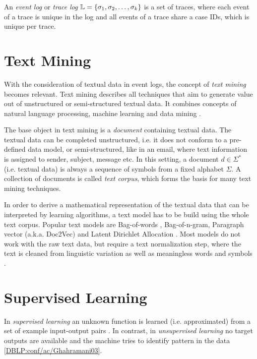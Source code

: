 \begin{definition}
	An \textit{event log} or \textit{trace log} $\mathbb{L} = \{ \sigma_1, \sigma _2, \dots, \sigma_k \}$ is a set of traces, where each event of a trace is unique in the log and all events of a trace share a case IDs, which is unique per trace.
\end{definition}

\section{Text Mining}

With the consideration of textual data in event logs, the concept of \textit{text mining} becomes relevant.
Text mining describes all techniques that aim to generate value out of unstructured or semi-structured textual data.
It combines concepts of natural language processing, machine learning and data mining \cite{DBLP:journals/coling/Mihalcea08}.

The base object in text mining is a \textit{document} containing textual data.
The textual data can be completed unstructured, i.e. it does not conform to a pre-defined data model, or semi-structured, like in an email, where text information is assigned to sender, subject, message etc.
In this setting, a document $d \in \Sigma^*$ (i.e. textual data) is always a sequence of symbols from a fixed alphabet $\Sigma$.
A collection of documents is called \textit{text corpus}, which forms the basis for many text mining techniques.

In order to derive a mathematical representation of the textual data that can be interpreted by learning algorithms, a text model has to be build using the whole text corpus.
Popular text models are Bag-of-words \cite{harris1954distributional}, Bag-of-n-gram, Paragraph vector (a.k.a. Doc2Vec) \cite{DBLP:conf/icml/LeM14} and Latent Dirichlet Allocation \cite{DBLP:journals/jmlr/BleiNJ03}.
Most models do not work with the raw text data, but require a text normalization step, where the text is cleaned from linguistic variation as well as meaningless words and symbols \cite{DBLP:books/lib/JurafskyM09}.

\section{Supervised Learning}

In \textit{supervised learning} an unknown function is learned (i.e. approximated) from a set of example input-output pairs \cite{DBLP:books/daglib/0023820}.
In contrast, in \textit{unsupervised learning} no target outputs are available and the machine tries to identify pattern in the data \ref{DBLP:conf/ac/Ghahramani03}.

